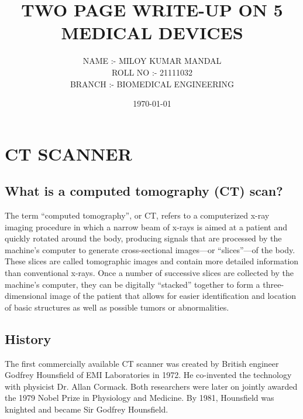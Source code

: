 \documentclass[a4paper,12pt]{report}
\title{TWO PAGE WRITE-UP ON 5 MEDICAL DEVICES}
\author{NAME :- MILOY KUMAR MANDAL\\ROLL NO :- 21111032\\BRANCH :- BIOMEDICAL ENGINEERING\\}
\date{\today}
\begin{document}
\maketitle
{}
\tableofcontents
\newpage
{}

\chapter{CT SCANNER}
\section{What is a computed tomography (CT) scan?}
The term “computed tomography”, or CT, refers to a computerized x-ray imaging procedure in which a narrow beam of x-rays is aimed at a patient and quickly rotated around the body, producing signals that are processed by the machine’s computer to generate cross-sectional images—or “slices”—of the body. These slices are called tomographic images and contain more detailed information than conventional x-rays. Once a number of successive slices are collected by the machine’s computer, they can be digitally “stacked” together to form a three-dimensional image of the patient that allows for easier identification and location of basic structures as well as possible tumors or abnormalities.\\ 
\section{History}
The first commercially available CT scanner was created by British engineer Godfrey Hounsfield of EMI Laboratories in 1972. He co-invented the technology with physicist Dr. Allan Cormack. Both researchers were later on jointly awarded the 1979 Nobel Prize in Physiology and Medicine. By 1981, Hounsfield was knighted and became Sir Godfrey Hounsfield.\\
\end{document}
